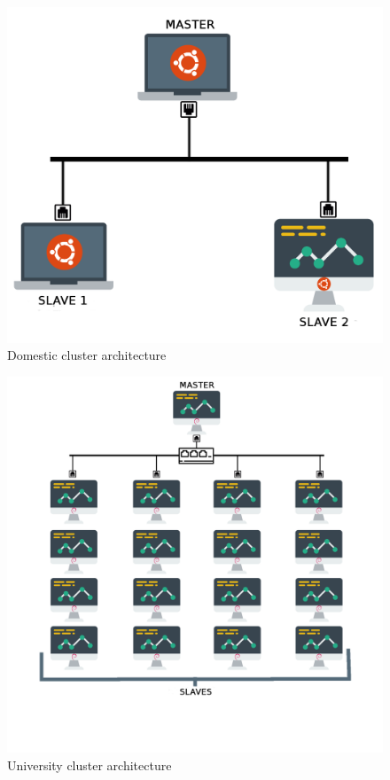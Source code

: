 \begin{figure}[htp!]
\centering
\caption{Domestic cluster architecture}
\label{domEN}
\includegraphics[scale=0.3]{graphics/DomENG}
\end{figure}

\begin{figure}[htp!]
\centering
\caption{University cluster architecture}
\label{uniEN}
\includegraphics[scale=0.25]{graphics/uniEN}
\end{figure}

